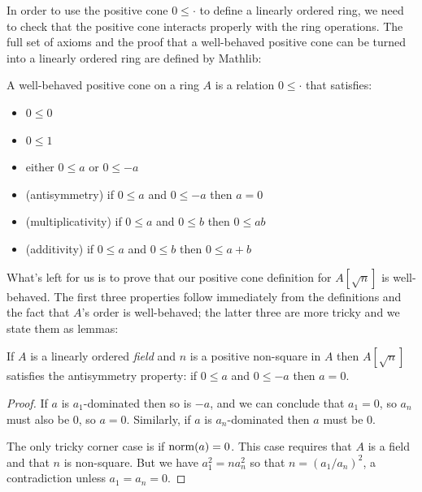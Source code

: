 In order to use the positive cone $0 \leq \cdot$ to define a linearly ordered
ring, we need to check that the positive cone interacts properly with the ring
operations. The full set of axioms and the proof that a
well-behaved positive cone can be turned into a linearly ordered ring are
defined by Mathlib:

\begin{definition}
  \label{def:ringCone}
  \mathlibok
  A well-behaved positive cone on a ring $A$ is a relation $0 \leq \cdot$ that satisfies:
  \begin{itemize}
    \item $0 \leq 0$
    \item $0 \leq 1$
    \item either $0 \leq a$ or $0 \leq -a$
    \item (antisymmetry) if $0 \leq a$ and $0 \leq -a$ then $a = 0$
    \item (multiplicativity) if $0 \leq a$ and $0 \leq b$ then $0 \leq ab$
    \item (additivity) if $0 \leq a$ and $0 \leq b$ then $0 \leq a + b$
  \end{itemize}
\end{definition}


What's left for us is to prove that our positive cone definition for
$A[\sqrt{n}]$ is well-behaved. The first three properties follow immediately
from the definitions and the fact that $A$'s order is well-behaved; the latter
three are more tricky and we state them as lemmas:

\begin{lemma}[Antisymmetry]
  \label{thm:antisymm}
  \leanok
  If $A$ is a linearly ordered \emph{field} and $n$ is a positive non-square in
  $A$ then $A[\sqrt{n}]$ satisfies the antisymmetry property: if $0 \leq a$ and
  $0 \leq -a$ then $a = 0$.
\end{lemma}
\begin{proof}
  \leanok
  If $a$ is $a_1$-dominated then so is $-a$, and we can conclude that $a_1 =
  0$, so $a_n$ must also be 0, so $a = 0$. Similarly, if $a$ is $a_n$-dominated
  then $a$ must be 0.

  The only tricky corner case is if $\operatorname{norm}(a) = 0$. This case requires that $A$
  is a field and that $n$ is non-square.  But we have $a_1^2 = na_n^2$ so that
  $n = (a_1/a_n)^2$, a contradiction unless $a_1 = a_n = 0$.
\end{proof}

